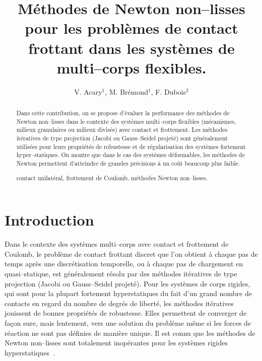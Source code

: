 \documentclass{CSMA2017}
\title{Méthodes de Newton non--lisses pour les problèmes de contact frottant dans les systèmes de multi--corps flexibles.}
\author{V. Acary$^1$, M. Brémond$^1$, F. Dubois$^2$}
\newcommand\red[1]{\textcolor{red}{#1}}
\newcommand\ndm[1]{\marginpar{\red{#1}}}
\begin{document}
\maketitle

\begin{abstract}
Dans cette contribution, on se propose d'évaluer la performance des méthodes de Newton non--lisses dans le contexte des systèmes multi--corps flexibles (mécanismes, milieux granulaires ou milieux divisés) avec contact et frottement. Les méthodes itératives de type projection (Jacobi ou Gauss--Seidel projeté) sont généralement utilisées pour leurs propriétés de robustesse et de régularisation des systèmes fortement hyper--statiques. On montre que dans le cas des systèmes déformables, les méthodes de Newton permettent d'atteindre de grandes précisions à un coût beaucoup plus faible.

\keywords contact unilatéral, frottement de Coulomb, méthodes Newton non--lisses.
\end{abstract}

\section{Introduction}

Dans le contexte des systèmes multi--corps avec contact et frottement de Coulomb, le problème de contact frottant discret que l'on obtient à chaque pas de temps après une discrétisation temporelle, ou à chaque pas de chargement en quasi--statique, est généralement résolu par des méthodes itératives de type projection (Jacobi ou Gauss--Seidel projeté). 
%
Pour les systèmes de corps rigides, qui sont pour la plupart fortement hyperstatiques du fait d'un grand nombre de contacts en regard du nombre de degrés de liberté, les méthodes itératives jouissent de bonnes propriétés de robustesse. Elles permettent de converger de façon sure, mais lentement, vers une solution du problème même si les forces de réaction ne sont pas définies de manière unique. Il est connu que les méthodes de Newton non--lisses sont totalement inopérantes pour les systèmes rigides hyperstatiques~\cite{bertailsdescoubes:inria-00557706}. \ndm{Une autre citation?}
\end{document}
